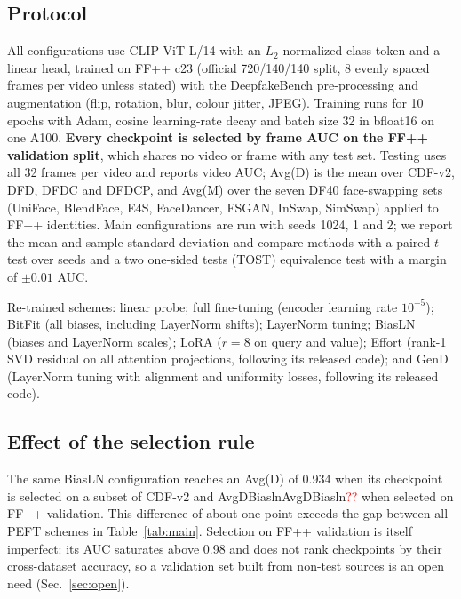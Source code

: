 \documentclass[fonts]{icst}
\newcommand{\num}[1]{\ifcsname #1\endcsname\csname #1\endcsname\else\textcolor{red}{??}\fi}
\begin{document}
\subsection{Protocol}
All configurations use CLIP ViT-L/14 with an $L_2$-normalized class token and a linear head, trained on FF++ c23 (official 720/140/140 split, 8 evenly spaced frames per video unless stated) with the DeepfakeBench pre-processing and augmentation (flip, rotation, blur, colour jitter, JPEG). Training runs for 10 epochs with Adam, cosine learning-rate decay and batch size 32 in bfloat16 on one A100. \textbf{Every checkpoint is selected by frame AUC on the FF++ validation split}, which shares no video or frame with any test set. Testing uses all 32 frames per video and reports video AUC; Avg(D) is the mean over CDF-v2, DFD, DFDC and DFDCP, and Avg(M) over the seven DF40 face-swapping sets (UniFace, BlendFace, E4S, FaceDancer, FSGAN, InSwap, SimSwap) applied to FF++ identities. Main configurations are run with seeds 1024, 1 and 2; we report the mean and sample standard deviation and compare methods with a paired $t$-test over seeds and a two one-sided tests (TOST) equivalence test with a margin of $\pm0.01$ AUC.

Re-trained schemes: linear probe; full fine-tuning (encoder learning rate $10^{-5}$); BitFit (all biases, including LayerNorm shifts); LayerNorm tuning; BiasLN (biases and LayerNorm scales); LoRA ($r{=}8$ on query and value); Effort (rank-1 SVD residual on all attention projections, following its released code); and GenD (LayerNorm tuning with alignment and uniformity losses, following its released code).

\subsection{Effect of the selection rule}
The same BiasLN configuration reaches an Avg(D) of 0.934 when its checkpoint is selected on a subset of CDF-v2 and \num{AvgDBiasln} when selected on FF++ validation. This difference of about one point exceeds the gap between all PEFT schemes in Table~\ref{tab:main}. Selection on FF++ validation is itself imperfect: its AUC saturates above 0.98 and does not rank checkpoints by their cross-dataset accuracy, so a validation set built from non-test sources is an open need (Sec.~\ref{sec:open}).

\begin{table}[!t]
\centering
\caption{Video AUC of re-trained schemes under one protocol (FF++ c23 training, checkpoint selected on FF++ validation). Avg(D) and Avg(M) are mean $\pm$ std over $n$ seeds; per-dataset values are seed means. Bold: best; shaded: second best.}
\label{tab:main}
\resizebox{\textwidth}{!}{}
\vspace{3mm}
\caption{Ablation of selective and low-rank schemes and of $L_2$ normalization before the classifier (same protocol). Bold: best; shaded: second best.}
\label{tab:ablation}
\resizebox{0.85\textwidth}{!}{}
\end{table}
\end{document}
